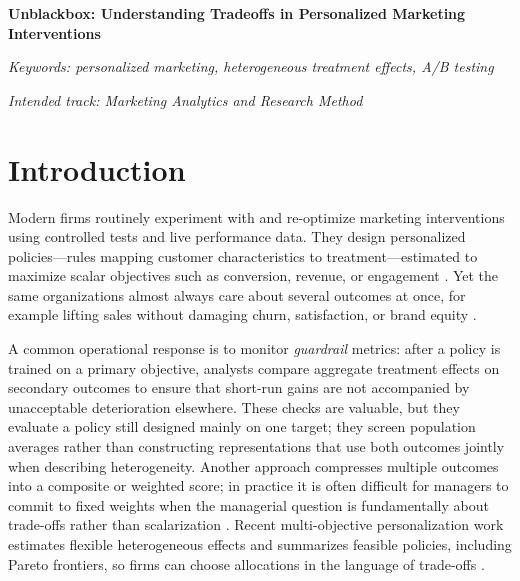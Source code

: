 \documentclass[12pt,a4paper]{article}
\begin{document}
\thispagestyle{plain}

\begin{center}
{\fontsize{14}{17}\selectfont\bfseries Unblackbox: Understanding Tradeoffs in Personalized Marketing Interventions\par}
\end{center}
\vspace{0.8\baselineskip}



\noindent{\fontsize{12}{18}\selectfont\EMACAbstractText\par}

\vspace{0.8\baselineskip}
\noindent\textit{Keywords: personalized marketing, heterogeneous treatment effects, A/B testing}

\vspace{0.5\baselineskip}
\noindent\textit{Intended track: Marketing Analytics and Research Method}

\vspace{1.0\baselineskip}
\clearpage

\section{Introduction}

Modern firms routinely experiment with and re-optimize marketing interventions using controlled tests and live performance data. They design personalized policies---rules mapping customer characteristics to treatment---estimated to maximize scalar objectives such as conversion, revenue, or engagement \citep{simester2020targeting, lemmens2025personalization, ascarza2018retention}. Yet the same organizations almost always care about several outcomes at once, for example lifting sales without damaging churn, satisfaction, or brand equity \citep{chandy2021better, hohnhold2015focusing, anderson2004longrun}.

A common operational response is to monitor \emph{guardrail} metrics: after a policy is trained on a primary objective, analysts compare aggregate treatment effects on secondary outcomes to ensure that short-run gains are not accompanied by unacceptable deterioration elsewhere. These checks are valuable, but they evaluate a policy still designed mainly on one target; they screen population averages rather than constructing representations that use both outcomes jointly when describing heterogeneity. Another approach compresses multiple outcomes into a composite or weighted score; in practice it is often difficult for managers to commit to fixed weights when the managerial question is fundamentally about trade-offs rather than scalarization \citep{rafieian2025multiobjective}. Recent multi-objective personalization work estimates flexible heterogeneous effects and summarizes feasible policies, including Pareto frontiers, so firms can choose allocations in the language of trade-offs \citep{rafieian2025multiobjective}.
\end{document}
